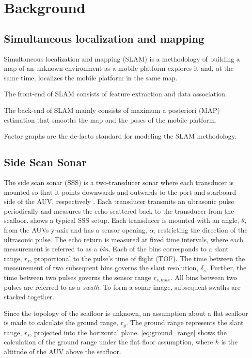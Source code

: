 \chapter{Background}

\section{Simultaneous localization and mapping}

Simultaneous localization and mapping (SLAM) is a methodology of building a map of an unknown environment as a mobile platform explores it and, at the same time, localizes the mobile platform in the same map. 

The front-end of SLAM consists of feature extraction and data association.

The back-end of SLAM mainly consists of maximum a posteriori (MAP) estimation that smooths the map and the poses of the mobile platform. 

Factor graphs are the de-facto standard for modeling the SLAM methodology. 

\section{Side Scan Sonar}

The side scan sonar (SSS) is a two-transducer sonar where each transducer is mounted so that it points downwards and outwards to the port and starboard side of the AUV, respectively \cite{Burguera2016High-ResolutionSonar}. Each transducer transmits an ultrasonic pulse periodically and measures the echo scattered back to the transducer from the seafloor. shows a typical SSS setup. Each transducer is mounted with an angle, $\theta$, from the AUVs y-axis and has a sensor opening, $\alpha$, restricting the direction of the ultrasonic pulse. The echo return is measured at fixed time intervals, where each measurement is referred to as a \textit{bin}. Each of the bins corresponds to a slant range, $r_s$, proportional to the pulse's time of flight (TOF). The time between the measurement of two subsequent bins governs the slant resolution, $\delta_s$. Further, the time between two pulses governs the sensor range $r_{s,max}$. All bins between two pulses are referred to as a \textit{swath}. To form a sonar image, subsequent swaths are stacked together.

Since the topology of the seafloor is unknown, an assumption about a flat seafloor is made to calculate the ground range, $r_g$. The ground range represents the slant range, $r_s$, projected into the horizontal plane. \cref{eq:ground_range} shows the calculation of the ground range under the flat floor assumption, where $h$ is the altitude of the AUV above the seafloor.

